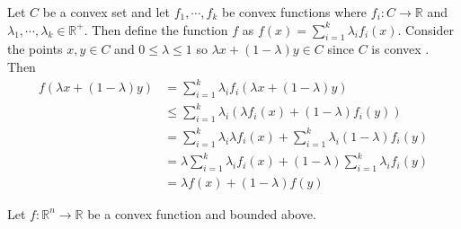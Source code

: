 \documentclass[12pt]{article}
\newcommand{\R}{\mathbb{R}}
\newenvironment{problem}[2][Problem]{\begin{trivlist}
\item[\hskip \labelsep {\bfseries #1}\hskip \labelsep {\bfseries #2}]}{\end{trivlist}}
\begin{document}
\begin{problem}{7.} 
Let $C$ be a convex set and let $f_1, \cdots, f_k$ be convex functions where $f_i:C \to \R$ and $\lambda_1, \cdots, \lambda_k \in \R^+$. Then define the function $f$ as $f(x) = \sum_{i=1}^{k} \lambda_if_i(x)$. Consider the points $x, y \in C$ and $0 \leq \lambda \leq 1$ so $\lambda x + (1-\lambda)y \in C$ since $C$ is convex . Then
\begin{align*}
 f(\lambda x + (1-\lambda)y) &= \sum_{i=1}^{k} \lambda_if_i(\lambda x + (1-\lambda)y) \\
 & \leq \sum_{i=1}^{k} \lambda_i (\lambda f_i(x) + (1-\lambda)f_i(y))   \\
  & =\sum_{i=1}^{k} \lambda_i \lambda f_i(x) + \sum_{i=1}^{k}  \lambda_i(1-\lambda)f_i(y) \\
  & =\lambda  \sum_{i=1}^{k} \lambda_i f_i(x) + (1-\lambda) \sum_{i=1}^{k}  \lambda_if_i(y) \\
  & = \lambda f(x) + (1- \lambda) f(y)
 \end{align*}
\end{problem}

\begin{problem}{13.} 
Let $f: \R^n \to \R$ be a convex function and bounded above. 
\end{problem}

\begin{problem}{20.} 
\end{problem}

\begin{problem}{21.} 
\end{problem}
\end{document}
